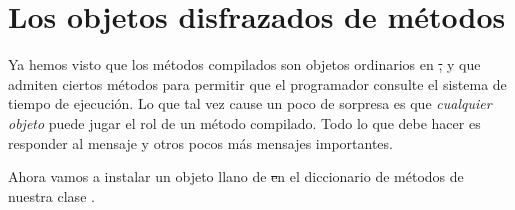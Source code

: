 \documentclass[a4paper,10pt,twoside]{book}
\begin{document}
\section{Los objetos disfrazados de métodos}

Ya hemos visto que los métodos compilados son objetos ordinarios en
\st, y que admiten ciertos métodos para permitir que el programador
consulte el sistema de tiempo de ejecución.  Lo que tal vez cause un
poco de sorpresa es que \emph{cualquier objeto}  puede jugar el rol de
un método compilado.  Todo lo que debe hacer es responder al mensaje
 y otros pocos más mensajes importantes.



Ahora vamos a instalar un objeto llano de \st en el diccionario de
métodos de nuestra clase .
\end{document}
